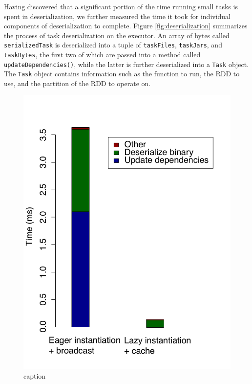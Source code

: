 Having discovered that a significant portion of the time running small tasks is spent in deserialization, we further measured the time it took for individual components of deserialization to complete. Figure \ref{fig:deserialization} summarizes the process of task deserialization on the executor. An array of bytes called \texttt{serializedTask} is deserialized into a tuple of \texttt{taskFiles}, \texttt{taskJars}, and \texttt{taskBytes}, the first two of which are passed into a method called \texttt{updateDependencies()}, while the latter is further deserialized into a \texttt{Task} object. The \texttt{Task} object contains information such as the function to run, the RDD to use, and the partition of the RDD to operate on.

\begin{figure}[t!]
 \begin{center}
   \includegraphics[scale=0.60]{images_graphs/optimizations/graph2/task_deser_micro.pdf}
 \end{center}
 \caption{caption}
 \label{fig:deserialization_times}
\end{figure}

